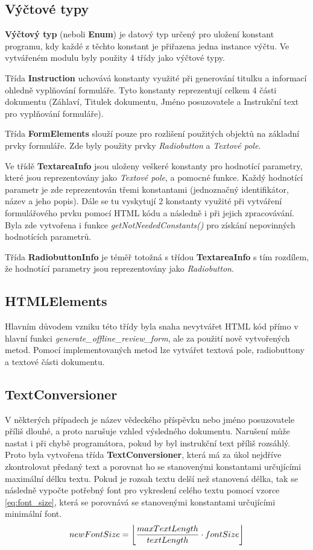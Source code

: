 \subsection{Výčtové typy}
\textbf{Výčtový typ} (neboli \textbf{Enum}) je datový typ určený pro uložení konstant programu, kdy každé z těchto konstant je přiřazena jedna instance výčtu. Ve vytvářeném modulu byly použity 4 třídy jako výčtové typy. 
\par
Třída \textbf{Instruction} uchovává konstanty využité při generování titulku a informací ohledně vyplňování formuláře. Tyto konstanty reprezentují celkem 4 části dokumentu (Záhlaví, Titulek dokumentu, Jméno posuzovatele a Instrukční text pro vyplňování formuláře).
\par
Třída \textbf{FormElements} slouží pouze pro rozlišení použitých objektů na základní prvky formuláře. Zde byly použity prvky \textit{Radiobutton} a \textit{Textové pole}.
\par
Ve třídě \textbf{TextareaInfo} jsou uloženy veškeré konstanty pro hodnotící parametry, které jsou reprezentovány jako \textit{Textové pole}, a pomocné funkce. Každý hodnotící parametr je zde reprezentován třemi konstantami (jednoznačný identifikátor, název a jeho popis). Dále se tu vyskytují 2 konstanty využité při vytváření formulářového prvku pomocí HTML kódu a následně i při jejich zpracovávání. Byla zde vytvořena i funkce \textit{getNotNeededConstants()} pro získání nepovinných hodnotících parametrů.
\par
Třída \textbf{RadiobuttonInfo} je téměř totožná s třídou \textbf{TextareaInfo} s tím rozdílem, že hodnotící parametry jsou reprezentovány jako \textit{Radiobutton}.
\subsection{HTMLElements}
Hlavním důvodem vzniku této třídy byla snaha nevytvářet HTML kód přímo v hlavní funkci \textit{generate\_offline\_review\_form}, ale za použití nově vytvořených metod. Pomocí implementovaných metod lze vytvářet textová pole, radiobuttony a textové části dokumentu.
\subsection{TextConversioner}
V některých případech je název vědeckého příspěvku nebo jméno posuzovatele příliš dlouhé, a proto narušuje vzhled výsledného dokumentu. Narušení může nastat i při chybě programátora, pokud by byl instrukční text příliš rozsáhlý. Proto byla vytvořena třída \textbf{TextConversioner}, která má za úkol nejdříve zkontrolovat předaný text a porovnat ho se stanovenými konstantami určujícími maximální délku textu. Pokud je rozsah textu delší než stanovená délka, tak se následně vypočte potřebný font pro vykreslení celého textu pomocí vzorce \eqref{eq:font_size}, která se porovnává se stanovenými konstantami určujícími minimální font. 
\begin{equation}
newFontSize = \floor*{\frac{maxTextLength}{textLength} \cdot fontSize} \label{eq:font_size}
\end{equation}

